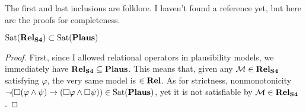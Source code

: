 \documentclass[letterpaper]{article}
\begin{document}
The first and last inclusions are folklore.  I haven't found a reference yet, but here are the proofs for completeness.

\begin{proposition}
    $\mathrm{Sat}( \textrm{\textbf{Rel}}_\textrm{\textbf{S4}} ) \subset \mathrm{Sat}( \textrm{\textbf{Plaus}} )$
\end{proposition}
\begin{proof}
    First, since I allowed relational operators in plausibility models, we immediately have $\textrm{\textbf{Rel}}_\textrm{\textbf{S4}} \subseteq \textrm{\textbf{Plaus}}$.  This means that, given any $\mathcal{M} \in \textrm{\textbf{Rel}}_\textrm{\textbf{S4}}$ satisfying $\varphi$, the very same model is $\in \textrm{\textbf{Rel}}$.  As for strictness, nonmonotonicity $\neg (\Box(\varphi \land \psi) \to (\Box \varphi \land \Box \psi)) \in \mathrm{Sat}( \textrm{\textbf{Plaus}} )$, yet it is not satisfiable by $\mathcal{M} \in \textrm{\textbf{Rel}}_\textrm{\textbf{S4}}$.
\end{proof}

    
    
    
\end{document}

